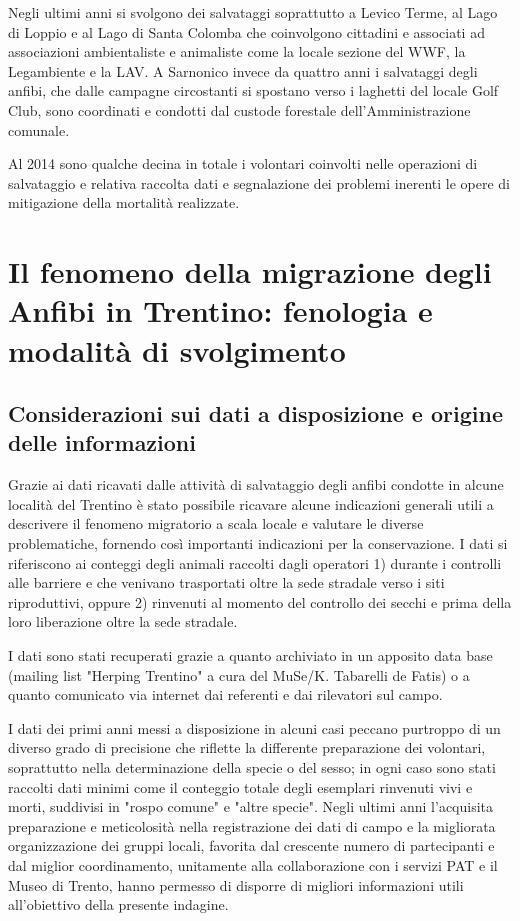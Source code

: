\documentclass[11pt,a4paper,twoside]{memoir}
\begin{document}
Negli ultimi anni si svolgono dei salvataggi soprattutto a Levico Terme, al Lago di Loppio e al Lago di Santa Colomba che coinvolgono cittadini e associati ad associazioni ambientaliste e animaliste come la locale sezione del WWF, la Legambiente e la LAV. A Sarnonico invece da quattro anni i salvataggi degli anfibi, che dalle campagne circostanti si spostano verso i laghetti del locale Golf Club, sono coordinati e condotti  dal custode forestale dell’Amministrazione comunale.

Al 2014 sono qualche decina in totale i volontari coinvolti nelle operazioni di salvataggio e relativa raccolta dati e segnalazione dei problemi inerenti le opere di mitigazione della mortalità realizzate.

\section{Il fenomeno della migrazione degli Anfibi in Trentino: fenologia e modalità di svolgimento}
\label{sec:statoanal_fenomig}
\subsection{Considerazioni sui dati a disposizione e origine delle informazioni}
\label{subsec:statoanal_fenomig_info}
Grazie ai dati ricavati dalle attività di salvataggio degli anfibi condotte in alcune località del Trentino è stato possibile ricavare alcune indicazioni generali utili a descrivere il fenomeno migratorio a scala locale e valutare le diverse problematiche, fornendo così importanti indicazioni per la conservazione.
I dati si riferiscono ai conteggi degli animali raccolti dagli operatori 1) durante i controlli alle barriere e che venivano trasportati oltre la sede stradale verso i siti riproduttivi, oppure 2) rinvenuti al momento del controllo dei secchi e prima della loro liberazione oltre la sede stradale.

I dati sono stati recuperati grazie a quanto archiviato in un apposito data base (mailing list "Herping Trentino" a cura del MuSe/K. Tabarelli de Fatis) o a quanto comunicato via internet dai referenti e dai rilevatori sul campo.

I dati dei primi anni messi a disposizione in alcuni casi peccano purtroppo di un diverso grado di precisione che riflette la differente preparazione dei volontari, soprattutto nella determinazione della specie o del sesso; in ogni caso sono stati raccolti dati minimi come il conteggio totale degli esemplari rinvenuti vivi e morti, suddivisi in "rospo comune" e "altre specie". Negli ultimi anni l’acquisita preparazione e meticolosità nella registrazione dei dati di campo e la migliorata organizzazione dei gruppi locali, favorita dal crescente numero di partecipanti e dal miglior coordinamento, unitamente alla collaborazione con i servizi PAT e il Museo di Trento, hanno permesso di disporre di migliori informazioni utili all’obiettivo della presente indagine. 
\end{document}
